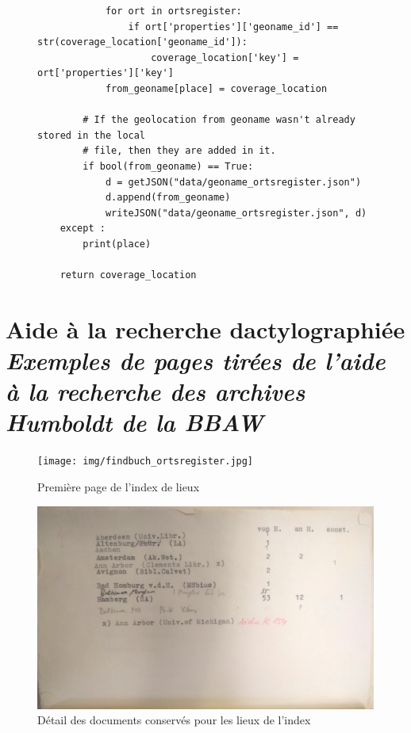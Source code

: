 \documentclass[a4paper, 12pt, twoside]{book}
\newcommand\ChapterSub[2]{
  \chapter[#1: {\itshape#2}]{#1\\[2ex]\Large\itshape#2}}
\begin{document}
\begin{figure}[h]
\begin{lstlisting}
            for ort in ortsregister:
                if ort['properties']['geoname_id'] == str(coverage_location['geoname_id']):
                    coverage_location['key'] = ort['properties']['key']
            from_geoname[place] = coverage_location
        
        # If the geolocation from geoname wasn't already stored in the local
        # file, then they are added in it.
        if bool(from_geoname) == True:
            d = getJSON("data/geoname_ortsregister.json")
            d.append(from_geoname)            
            writeJSON("data/geoname_ortsregister.json", d)
    except :
        print(place)
    
    return coverage_location

\end{lstlisting}
\end{figure}



\ChapterSub{Aide à la recherche dactylographiée}{Exemples de pages tirées de l'aide à la recherche des archives Humboldt de la BBAW}

\begin{figure}[h!]
    \centering
         \texttt{[image: img/findbuch\_ortsregister.jpg]}
         \caption{Première page de l'index de lieux}
         \label{fig:findbuchOrtsregister}
\end{figure}

\begin{figure}[h!]
    \centering
    \includegraphics[width=15cm]{img/findbuch_detail.jpg}
    \caption{Détail des documents conservés pour les lieux de l'index}
    \label{fig:findbuchDocConserves}
\end{figure}
\end{document}
